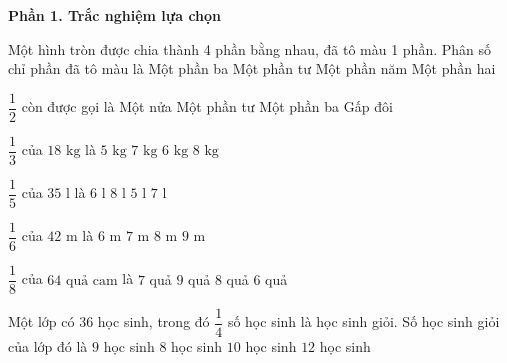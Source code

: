 \textbf{Phần 1. Trắc nghiệm lựa chọn}

\begin{ex} %
Một hình tròn được chia thành 4 phần bằng nhau, đã tô màu 1 phần. Phân số chỉ phần đã tô màu là
\choice
{Một phần ba}
{\True Một phần tư}
{Một phần năm}
{Một phần hai}
\end{ex}

\begin{ex} %
$\dfrac{1}{2}$ còn được gọi là
\choice
{\True Một nửa}
{Một phần tư}
{Một phần ba}
{Gấp đôi}
\end{ex}

\begin{ex} %
$\dfrac{1}{3}$ của $18\text{ kg}$ là
\choice
{$5\text{ kg}$}
{$7\text{ kg}$}
{\True $6\text{ kg}$}
{$8\text{ kg}$}
\end{ex}

\begin{ex} %
$\dfrac{1}{5}$ của $35\text{ l}$ là
\choice
{$6\text{ l}$}
{$8\text{ l}$}
{$5\text{ l}$}
{\True $7\text{ l}$}
\end{ex}

\begin{ex} %
$\dfrac{1}{6}$ của $42\text{ m}$ là
\choice
{$6\text{ m}$}
{\True $7\text{ m}$}
{$8\text{ m}$}
{$9\text{ m}$}
\end{ex}

\begin{ex} %
$\dfrac{1}{8}$ của $64\text{ quả cam}$ là
\choice
{$7$ quả}
{$9$ quả}
{\True $8$ quả}
{$6$ quả}
\end{ex}

\begin{ex} %
Một lớp có 36 học sinh, trong đó $\dfrac{1}{4}$ số học sinh là học sinh giỏi. Số học sinh giỏi của lớp đó là
\choice
{\True $9$ học sinh}
{$8$ học sinh}
{$10$ học sinh}
{$12$ học sinh}
\end{ex}

